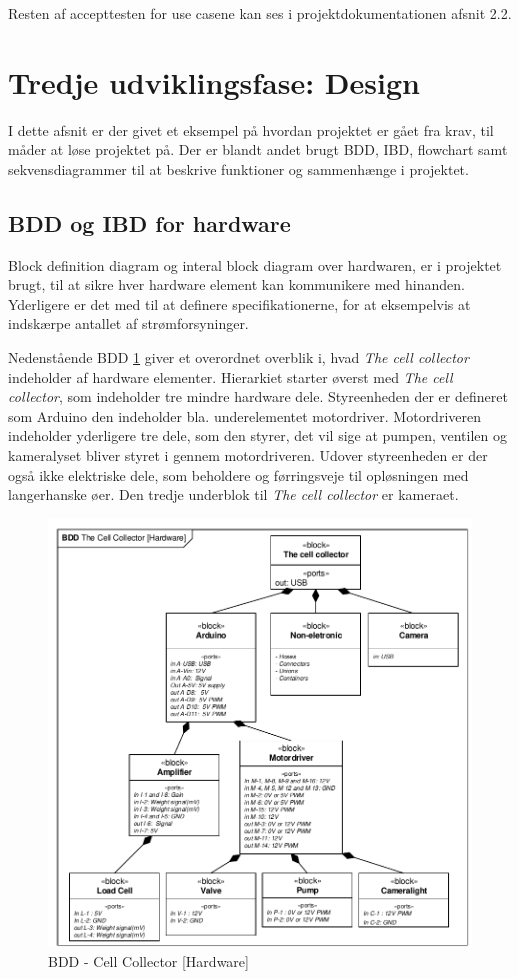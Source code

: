 Resten af accepttesten for use casene kan ses i projektdokumentationen afsnit 2.2.

\section{Tredje udviklingsfase: Design}
\label{subsec:design}
I dette afsnit er der givet et eksempel på hvordan projektet er gået fra krav, til måder at løse projektet på. Der er blandt andet brugt BDD, IBD, flowchart samt sekvensdiagrammer til at beskrive funktioner og sammenhænge i projektet. 

\subsection{BDD og IBD for hardware}
Block definition diagram og interal block diagram over hardwaren, er i projektet brugt, til at sikre hver hardware element kan kommunikere med hinanden. Yderligere er det med til at definere specifikationerne, for at eksempelvis at indskærpe antallet af strømforsyninger.

Nedenstående BDD \ref{fig:bdd_Hardware} giver et overordnet overblik i, hvad \textit{The cell collector} indeholder af hardware elementer. Hierarkiet starter øverst med \textit{The cell collector}, som indeholder tre mindre hardware dele. Styreenheden der er defineret som Arduino den indeholder bla. underelementet motordriver. Motordriveren indeholder yderligere tre dele, som den styrer, det vil sige at pumpen, ventilen og kameralyset bliver styret i gennem motordriveren. Udover styreenheden er der også ikke elektriske dele, som beholdere og førringsveje til opløsningen med langerhanske øer. Den tredje underblok til \textit{The cell collector} er kameraet.

\begin{figure}[H]
	\centering
	\includegraphics[width=1\textwidth]{pdf/BDD_Hardware.pdf}
	\caption{BDD - Cell Collector [Hardware]}
	\label{fig:bdd_Hardware}
\end{figure}

